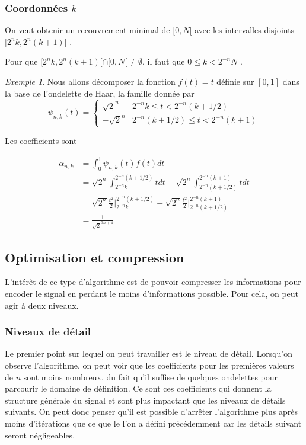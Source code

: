 \documentclass[]{article}
\theoremstyle{remark}
\newtheorem{myexmpl}{Exemple}
\theoremstyle{definition}
\begin{document}
\subsubsection{Coordonnées $k$}

On veut obtenir un recouvrement minimal de $[0,N[$ avec les intervalles disjoints $[2^{n}k,2^{n}(k+1)[$ .

Pour que $[2^{n}k,2^{n}(k+1)[\cap[0,N[\neq\emptyset$, il faut que $0\le k< 2^{-n}N$ .

\begin{myexmpl}
	Nous allons décomposer la fonction $f(t)=t$ définie sur $[0, 1]$ dans la base de l'ondelette de Haar, la famille donnée par
	$$\psi_{n, k}(t) = \left\{
	\begin{array}{cc}
		\sqrt{2}^n & 2^{-n}k \leqslant t < 2^{-n} (k+1/2) \\
		-\sqrt{2}^n & 2^{-n}(k+1/2) \leqslant t < 2^{-n} (k+1)
	\end{array}
	\right.$$
	
	Les coefficients sont 
	
	\begin{align*}
		\alpha_{n, k} &= \int_{0}^{1} \psi_{n, k}(t) f(t) dt \\
		&= \sqrt{2^n} \int_{2^{-n}k}^{2^{-n}(k+1/2)} t dt - \sqrt{2^n} \int_{2^{-n}(k+1/2)}^{2^{-n}(k+1)} t dt \\
		&= \sqrt{2^n} \frac{t^2}{2} \bigg \vert_{2^{-n} k}^{2^{-n}(k+1/2)} - \sqrt{2^n} \frac{t^2}{2} \bigg \vert_{2^{-n} (k+1/2)}^{2^{-n}(k+1)} \\
		&= \frac{1}{\sqrt{2}^{3n + 4}}
	\end{align*}
\end{myexmpl}



\subsection{Optimisation et compression}

L'intérêt de ce type d'algorithme est de pouvoir compresser les informations pour encoder le signal en perdant le moins d'informations possible. Pour cela, on peut agir à deux niveaux.

\subsubsection{Niveaux de détail}
	Le premier point sur lequel on peut travailler est le niveau de détail. Lorsqu'on observe l'algorithme, on peut voir que les coefficients pour les premières valeurs de $n$ sont moins nombreux, du fait qu'il suffise de quelques ondelettes pour parcourir le domaine de définition. Ce sont ces coefficients qui donnent la structure générale du signal et sont plus impactant que les niveaux de détails suivants. On peut donc penser qu'il est possible d'arrêter l'algorithme plus après moins d'itérations que ce que le l'on a défini précédemment car les détails suivant seront négligeables. 
\end{document}
